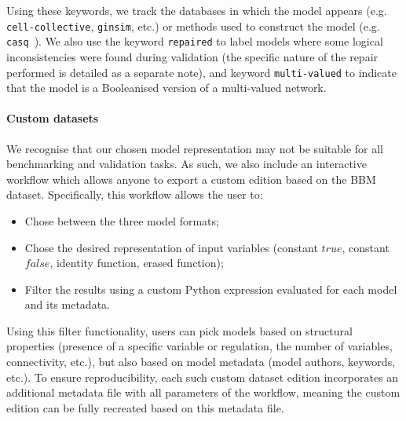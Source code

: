 \documentclass[fleqn,10pt]{wlscirep}
\begin{document}
Using these keywords, we track the databases in which the model appears (e.g. \texttt{cell-collective}, \texttt{ginsim}, etc.) or methods used to construct the model (e.g. \texttt{casq}~\cite{casq}). We also use the keyword \texttt{repaired} to label models where some logical inconsistencies were found during validation (the specific nature of the repair performed is detailed as a separate note), and keyword \texttt{multi-valued} to indicate that the model is a Booleanised version of a multi-valued network.

\paragraph*{Custom datasets}

We recognise that our chosen model representation may not be suitable for all benchmarking and validation tasks. As such, we also include an interactive workflow which allows anyone to export a custom edition based on the BBM dataset. Specifically, this workflow allows the user to:

\begin{itemize}
	\item Chose between the three model formats;
	\item Chose the desired representation of input variables (constant $\mathit{true}$, constant $\mathit{false}$, identity function, erased function);
	\item Filter the results using a custom Python expression evaluated for each model and its metadata.
\end{itemize}

Using this filter functionality, users can pick models based on structural properties (presence of a specific variable or regulation, the number of variables, connectivity, etc.), but also based on model metadata (model authors, keywords, etc.). To ensure reproducibility, each such custom dataset edition incorporates an additional metadata file with all parameters of the workflow, meaning the custom edition can be fully recreated based on this metadata file.

\end{document}
